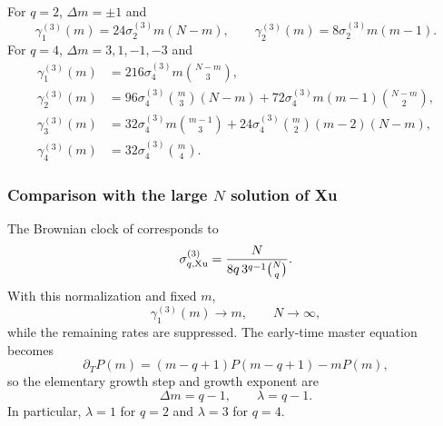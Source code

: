 \documentclass{article}
\theoremstyle{definition}
\begin{document}
For $q=2$, $\Delta m=\pm1$ and
\begin{equation}
    \gamma_1^{(3)}(m)
    =24\sigma_2^{(3)}m(N-m),
    \qquad
    \gamma_2^{(3)}(m)
    =8\sigma_2^{(3)}m(m-1).
\end{equation}
For $q=4$, $\Delta m=3,1,-1,-3$ and
\begin{align}
    \gamma_1^{(3)}(m)
    &=216\sigma_4^{(3)}m\binom{N-m}{3},
    \\
    \gamma_2^{(3)}(m)
    &=96\sigma_4^{(3)}\binom m3(N-m)
      +72\sigma_4^{(3)}m(m-1)\binom{N-m}{2},
    \\
    \gamma_3^{(3)}(m)
    &=32\sigma_4^{(3)}m\binom{m-1}{3}
      +24\sigma_4^{(3)}\binom m2(m-2)(N-m),
    \\
    \gamma_4^{(3)}(m)
    &=32\sigma_4^{(3)}\binom m4.
\end{align}

\subsubsection{Comparison with the large $N$ solution of Xu}

The Brownian clock of \cite{xu2025dynamics} corresponds to
\begin{equation}
    \sigma_{q,{\rm Xu}}^{(3)}
    =\frac{N}{8q\,3^{q-1}\binom Nq}.
\end{equation}
With this normalization and fixed $m$,
\begin{equation}
    \gamma_1^{(3)}(m)\longrightarrow m,
    \qquad N\to\infty,
\end{equation}
while the remaining rates are suppressed.  The early-time master equation
becomes
\begin{equation}
    \partial_TP(m)
    =(m-q+1)P(m-q+1)-mP(m),
\end{equation}
so the elementary growth step and growth exponent are
\begin{equation}
    \Delta m=q-1,
    \qquad
    \lambda=q-1.
\end{equation}
In particular, $\lambda=1$ for $q=2$ and $\lambda=3$ for $q=4$.
\end{document}
